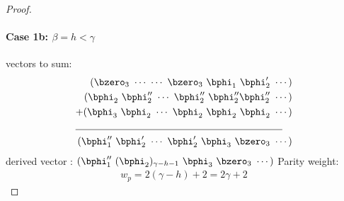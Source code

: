 \documentclass[11pt, oneside, dvipdfmx]{book}
\begin{document}
\begin{proof}
\paragraph{Case 1b: $\beta=h<\gamma$\newline}
 vectors to sum:
\begin{align*}
(\bzero_{3}~\cdots~\cdots~\bzero_{3}~\bphi_1~\bphi'_2~\cdots)\\
(\bphi_2~\bphi''_2~\cdots~\bphi''_2~\bphi''_2\bphi''_2~\cdots)\\
+(\bphi_3~\bphi_2~\cdots~\bphi_2~\bphi_2~\bphi_2~\cdots)\\
\cline{1-2}
(\bphi''_1~\bphi'_2~\cdots~\bphi'_2~\bphi_3~\bzero_3~\cdots)
\end{align*}
derived vector : $(\bphi''_1~(\bphi_2)_{\gamma-h-1}~\bphi_3~\bzero_3~\cdots)$\newline
Parity weight: \begin{equation}
\begin{split}
w_p=2(\gamma-h)+2=2\gamma+2
\end{split}
\end{equation}


\end{proof}
\end{document}
